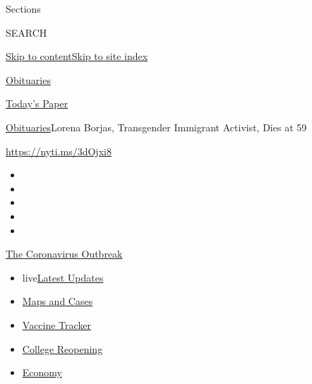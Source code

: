 Sections

SEARCH

\protect\hyperlink{site-content}{Skip to
content}\protect\hyperlink{site-index}{Skip to site index}

\href{https://www.nytimes.com/section/obituaries}{Obituaries}

\href{https://myaccount.nytimes.com/auth/login?response_type=cookie\&client_id=vi}{}

\href{https://www.nytimes.com/section/todayspaper}{Today's Paper}

\href{/section/obituaries}{Obituaries}\textbar{}Lorena Borjas,
Transgender Immigrant Activist, Dies at 59

\url{https://nyti.ms/3dOjxi8}

\begin{itemize}
\item
\item
\item
\item
\item
\end{itemize}

\href{https://www.nytimes.com/news-event/coronavirus?action=click\&pgtype=Article\&state=default\&region=TOP_BANNER\&context=storylines_menu}{The
Coronavirus Outbreak}

\begin{itemize}
\tightlist
\item
  live\href{https://www.nytimes.com/2020/08/03/world/coronavirus-covid-19.html?action=click\&pgtype=Article\&state=default\&region=TOP_BANNER\&context=storylines_menu}{Latest
  Updates}
\item
  \href{https://www.nytimes.com/interactive/2020/us/coronavirus-us-cases.html?action=click\&pgtype=Article\&state=default\&region=TOP_BANNER\&context=storylines_menu}{Maps
  and Cases}
\item
  \href{https://www.nytimes.com/interactive/2020/science/coronavirus-vaccine-tracker.html?action=click\&pgtype=Article\&state=default\&region=TOP_BANNER\&context=storylines_menu}{Vaccine
  Tracker}
\item
  \href{https://www.nytimes.com/2020/08/02/us/covid-college-reopening.html?action=click\&pgtype=Article\&state=default\&region=TOP_BANNER\&context=storylines_menu}{College
  Reopening}
\item
  \href{https://www.nytimes.com/live/2020/08/03/business/stock-market-today-coronavirus?action=click\&pgtype=Article\&state=default\&region=TOP_BANNER\&context=storylines_menu}{Economy}
\end{itemize}

